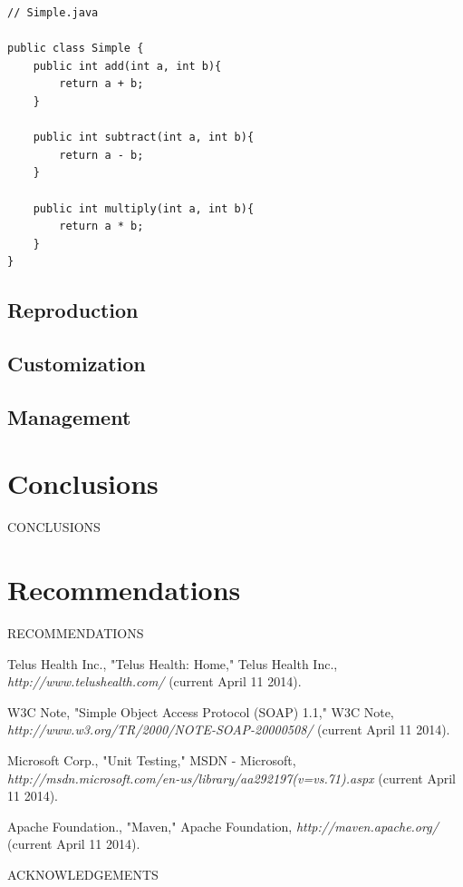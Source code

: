 \documentclass[12pt]{article}
\begin{document}
\begin{lstlisting}
// Simple.java

public class Simple {
	public int add(int a, int b){
		return a + b;
	}
	
	public int subtract(int a, int b){
		return a - b;
	}
	
	public int multiply(int a, int b){
		return a * b;
	}
}
\end{lstlisting}

\subsection{Reproduction}
\subsection{Customization}
\subsection{Management}


\section{Conclusions}
CONCLUSIONS


\section{Recommendations}
RECOMMENDATIONS


\newpage



\begin{thebibliography}{1}

   Telus Health Inc., "Telus Health: Home," Telus Health Inc., {\em http://www.telushealth.com/} (current April 11 2014).

   W3C Note, "Simple Object Access Protocol (SOAP) 1.1," W3C Note, {\em http://www.w3.org/TR/2000/NOTE-SOAP-20000508/} (current April 11 2014).

 Microsoft Corp., "Unit Testing," MSDN - Microsoft, {\em http://msdn.microsoft.com/en-us/library/aa292197(v=vs.71).aspx} (current April 11 2014).

 Apache Foundation., "Maven," Apache Foundation, {\em http://maven.apache.org/} (current April 11 2014).

\end{thebibliography}
\newpage


ACKNOWLEDGEMENTS
\newpage


\end{document}
